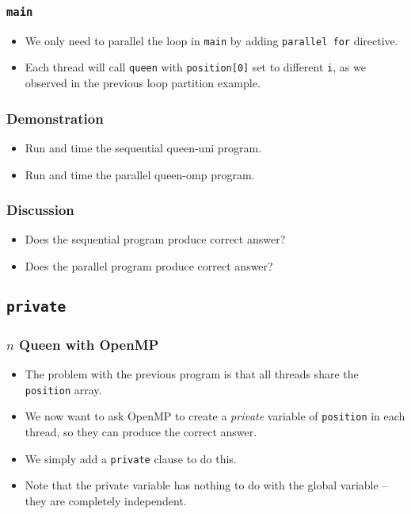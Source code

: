 \documentclass{beamer}
\begin{document}
\begin{frame}
\frametitle{\tt main}
\begin{itemize}
\item We only need to parallel the loop in {\tt main} by adding
 {\tt parallel for} directive.
\item Each thread will call {\tt queen} with {\tt position[0]} set to
  different {\tt i}, as we observed in the previous loop partition
  example.
\end{itemize}
\end{frame}

\begin{frame}
\frametitle{Demonstration}
\begin{itemize}
\item Run and time the sequential queen-uni program.
\item Run and time the parallel queen-omp program.
\end{itemize}
\end{frame}

\begin{frame}
\frametitle{Discussion}
\begin{itemize}
\item Does the sequential program produce correct answer?
\item Does the parallel program produce correct answer?
\end{itemize}
\end{frame}


\subsection{\tt private}

\begin{frame}
\frametitle{$n$ Queen with OpenMP}
\begin{itemize}
\item The problem with the previous program is that all threads share
  the {\tt position} array.
\item We now want to ask OpenMP to create a {\em private} variable of
  {\tt position} in each thread, so they can produce the correct
  answer.
\item We simply add a {\tt private} clause to do this.  
\item Note that the private variable has nothing to do with the global
  variable -- they are completely independent.
\end{itemize}
\end{frame}
\end{document}
